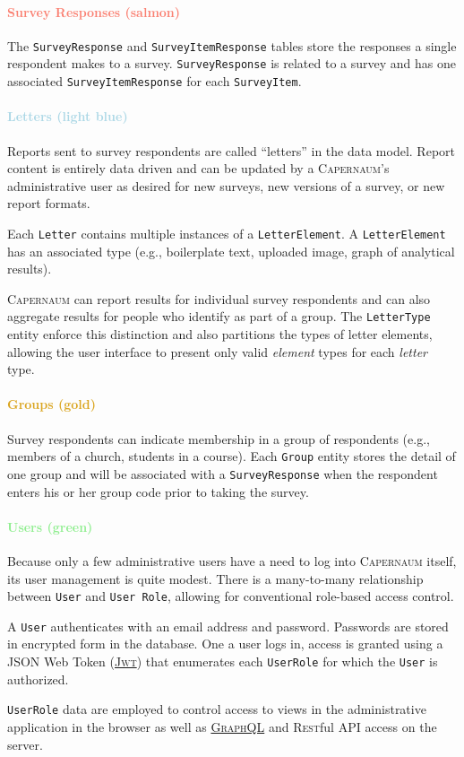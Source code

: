 \documentclass{article}
\newcommand{\caper}{\textsc{Capernaum}}
\newcommand{\rest}{\textsc{Rest}ful}
\newcommand{\gql}{\href{https://graphql.org/}{\textsc{GraphQL}}}
\newcommand{\jwt}{\href{https://jwt.io/}{\textsc{Jwt}}}
\begin{document}
\paragraph{\textcolor{Salmon}{Survey Responses (salmon)}}

The \texttt{SurveyResponse}
and \texttt{SurveyItemResponse}
tables store the responses a single respondent
makes to a survey.
\texttt{SurveyResponse} is related to a survey
and has one associated \texttt{SurveyItemResponse}
for each \texttt{SurveyItem}.

\paragraph{\textcolor{LightBlue}{Letters (light blue)}}

Reports sent to survey respondents are called ``letters'' in the data model.
Report content is entirely data driven and can be updated by a \caper's administrative user
as desired for new surveys, new versions of a survey, or new report formats.

Each \texttt{Letter} contains multiple
instances of a \texttt{LetterElement}.
A \texttt{LetterElement} has an associated type
(e.g., boilerplate text,
uploaded image,
graph of analytical results).

\caper{} can report results for individual survey respondents
and can also aggregate results for people who identify as part of a group.
The \texttt{LetterType} entity enforce this distinction
and also partitions the types of letter elements,
allowing the user interface to present only valid \emph{element} types
for each \emph{letter} type.

\paragraph{\textcolor{Goldenrod}{Groups (gold)}}

Survey respondents can indicate membership in a group of respondents
(e.g., members of a church, students in a course).
Each \texttt{Group} entity stores the detail of one group
and will be associated with a \texttt{SurveyResponse}
when the respondent enters his or her group code
prior to taking the survey.

\paragraph{\textcolor{LightGreen}{Users (green)}}

Because only a few administrative users have a need to log into \caper{} itself,
its user management is quite modest.
There is a many-to-many relationship between \texttt{User} and \texttt{User Role},
allowing for conventional role-based access control.

A \texttt{User} authenticates with an email address and password.
Passwords are stored in encrypted form in the database.
One a user logs in,
access is granted using a
JSON Web Token (\jwt)
that enumerates each \texttt{UserRole} for which the \texttt{User} is authorized.

\texttt{UserRole} data are employed to control access to views
in the administrative application in the browser
as well as \gql{} and \rest{} API access on the server.
\end{document}
